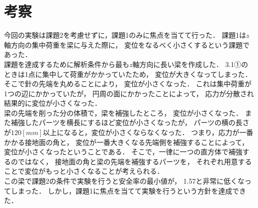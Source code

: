 \newpage
\section{考察}
  今回の実験は課題2を考慮せずに，課題1のみに焦点を当てて行った．
  課題1は$z$軸方向の集中荷重を梁に与えた際に，
  変位をなるべく小さくするという課題であった．\\\indent
  課題を達成するために解析条件から最も$z$軸方向に長い梁を作成した．
  3.1①のときは1点に集中して荷重がかかっていたため，
  変位が大きくなってしまった．
  そこで針の先端を丸めることにより，
  変位が小さくなった．
  これは集中荷重が1つの辺にかかっていたが，
  円周の面にかかったことによって，
  応力が分散され結果的に変位が小さくなった．\\\indent
  梁の先端を削った分の体積で，梁を補強したところ，
  変位が小さくなった．
  また補強したパーツを横長にするほど変位が小さくなったが，
  パーツの横の長さが$120[mm]$以上になると，変位が小さくならなくなった．
  つまり，応力が一番かかる接地面の角と，
  変位が一番大きくなる先端側を補強することによって，変位が小さくなったということである．
  そこで，一律に一つの直方体で補強するのではなく，
  接地面の角と梁の先端を補強するパーツを，
  それぞれ用意することで変位がもっと小さくなることが考えられる．\\\indent
  この梁で課題2の条件で実験を行うと安全率の最小値が，
  1.57と非常に低くなってしまった．
  しかし，課題1に焦点を当てて実験を行うという方針を達成できた．
